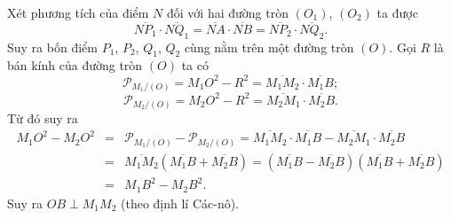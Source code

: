 \begin{bt}
{\begin{center}
		\end{center}
		Xét phương tích của điểm $N$ đối với hai đường tròn $\left(O_1\right)$, $\left(O_2\right)$ ta được $$\overline{NP_1}\cdot \overline{NQ_1}=\overline{NA}\cdot \overline{NB}=\overline{NP_2}\cdot \overline{NQ_2}.$$
		Suy ra  bốn điểm $P_1$, $P_2$, $Q_1$, $Q_2$ cùng nằm trên một đường tròn $(O)$.
		Gọi $R$ là bán kính của đường tròn $(O)$ ta có 
		\[\mathscr{P}_{M_1/(O)}=M_1O^2-R^2=\overline{M_1M_2}\cdot \overline{M_1B};\]  \[\mathscr{P}_{M_2/(O)}=M_2O^2-R^2=\overline{M_2M_1}\cdot \overline{M_2B}.\]
		Từ đó suy ra
		{\allowdisplaybreaks
		\begin{eqnarray*}
			M_1O^2-M_2O^2 &=& \mathscr{P}_{M_1/(O)}-\mathscr{P}_{M_2/(O)}=\overline{M_1M_2}\cdot \overline{M_1B}-\overline{M_2M_1}\cdot \overline{M_2B}\\
			&=& \overline{M_1M_2}\left( \overline{M_1B}+\overline{M_2B} \right)=\left( \overline{M_1B}-\overline{M_2B} \right)\left( \overline{M_1B}+\overline{M_2B} \right)\\
			&=& M_1B^2-M_2B^2.
		\end{eqnarray*}}Suy ra $OB\perp M_1M_2$ (theo định lí Các-nô).	
	}
\end{bt}


